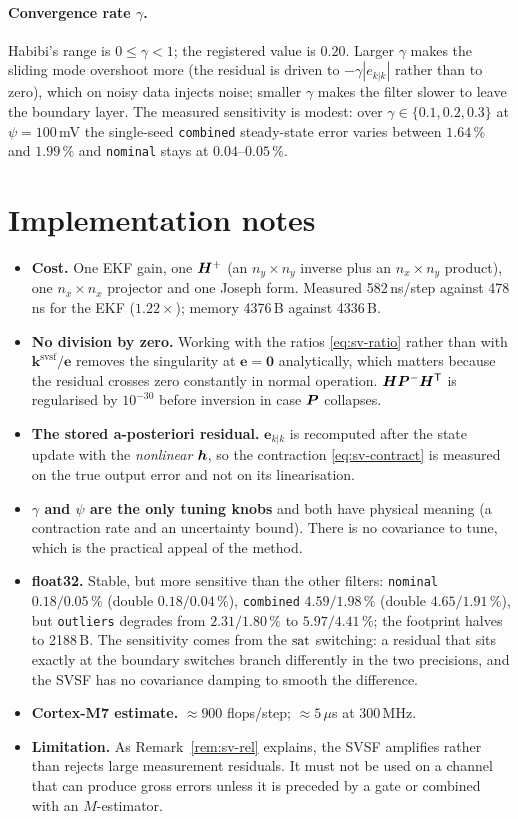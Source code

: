 \paragraph{Convergence rate $\gamma$.}  Habibi's range is $0\le\gamma<1$; the registered value is
$0.20$.  Larger $\gamma$ makes the sliding mode overshoot more (the residual is driven to
$-\gamma|e_{k|k}|$ rather than to zero), which on noisy data injects noise; smaller $\gamma$ makes
the filter slower to leave the boundary layer.  The measured sensitivity is modest: over
$\gamma\in\{0.1,0.2,0.3\}$ at $\psi=100$\,mV the single-seed \texttt{combined} steady-state error
varies between $1.64\,\%$ and $1.99\,\%$ and \texttt{nominal} stays at $0.04$--$0.05\,\%$.

\section{Implementation notes}
\begin{itemize}[nosep]
\item \textbf{Cost.}  One EKF gain, one $\bm{H}^{+}$ (an $n_y\times n_y$ inverse plus an
$n_x\times n_y$ product), one $n_x\times n_x$ projector and one Joseph form.  Measured
582\,ns/step against 478\,ns for the EKF ($1.22\times$); memory 4376\,B against 4336\,B.
\item \textbf{No division by zero.}  Working with the ratios \eqref{eq:sv-ratio} rather than with
$\bm{k}^{\mathrm{svsf}}/\bm{e}$ removes the singularity at $\bm{e}=\bm0$ analytically, which
matters because the residual crosses zero constantly in normal operation.
$\bm{H}\bm{P}^{-}\bm{H}^{\mathsf{T}}$ is regularised by $10^{-30}$ before inversion in case $\bm{P}$ collapses.
\item \textbf{The stored a-posteriori residual.}  $\bm{e}_{k|k}$ is recomputed after the state
update with the \emph{nonlinear} $\bm{h}$, so the contraction \eqref{eq:sv-contract} is measured on
the true output error and not on its linearisation.
\item \textbf{$\gamma$ and $\psi$ are the only tuning knobs} and both have physical meaning
(a contraction rate and an uncertainty bound).  There is no covariance to tune, which is the
practical appeal of the method.
\item \textbf{float32.}  Stable, but more sensitive than the other filters: \texttt{nominal}
$0.18/0.05\,\%$ (double $0.18/0.04\,\%$), \texttt{combined} $4.59/1.98\,\%$ (double
$4.65/1.91\,\%$), but \texttt{outliers} degrades from $2.31/1.80\,\%$ to $5.97/4.41\,\%$; the
footprint halves to 2188\,B.  The
sensitivity comes from the $\operatorname{sat}$ switching: a residual that sits exactly at the boundary switches
branch differently in the two precisions, and the SVSF has no covariance damping to smooth the
difference.
\item \textbf{Cortex-M7 estimate.}  $\approx900$ flops/step; $\approx5\,\mu$s at 300\,MHz.
\item \textbf{Limitation.}  As Remark~\ref{rem:sv-rel} explains, the SVSF amplifies rather than
rejects large measurement residuals.  It must not be used on a channel that can produce gross
errors unless it is preceded by a gate or combined with an $M$-estimator.
\end{itemize}

